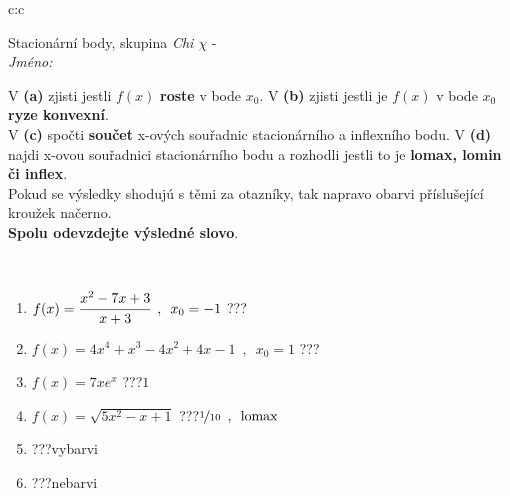 \documentclass[10pt]{report}
\begin{document}
\newpage
\thispagestyle{empty}
\begin{tabular}{c:c}
\begin{minipage}[c][104.5mm][t]{0.5\linewidth}
\begin{center}
\vspace{7mm}
{\huge Stacionární body, skupina \textit{Chi $\chi$} -}\\[5mm]
\textit{Jméno:}\phantom{xxxxxxxxxxxxxxxxxxxxxxxxxxxxxxxxxxxxxxxxxxxxxxxxxxxxxxxxxxxxxxxxx}\\[5mm]
\begin{minipage}{0.95\linewidth}
\begin{center}
{\small V \textbf{(a)} zjisti jestli $f(x)$ \textbf{roste} v bode $x_0$. V \textbf{(b)} zjisti jestli je $f(x)$ v bode $x_0$ \textbf{ryze konvexní}.\\V \textbf{(c)} spočti \textbf{součet} x-ových souřadnic stacionárního a inflexního bodu. V \textbf{(d)} najdi x-ovou souřadnici stacionárního bodu a rozhodli jestli to je \textbf{lomax, lomin či inflex}.\\Pokud se výsledky shodujú s těmi za otazníky, tak napravo obarvi příslušející kroužek načerno.\\\textbf{Spolu odevzdejte výsledné slovo}}.
\end{center}
\end{minipage}
\\[1mm]
\begin{minipage}{0.79\linewidth}
\begin{center}
\begin{varwidth}{\linewidth}
\begin{enumerate}
\normalsize
\item $f(x)=\cfrac{x^2-7x+3}{x+3}\enspace , \enspace x_0=-1$\quad \dotfill\; ???\;\dotfill \quad {}
\item $f(x)=4x^4+x^3-4x^2+4x-1\enspace , \enspace x_0=1$\quad \dotfill\; ???\;\dotfill \quad {}
\item $f(x)=7xe^{x}$\quad \dotfill\; ???\;\dotfill \quad $1$
\item $f(x)=\sqrt{5x^2-x+1}$\quad \dotfill\; ???\;\dotfill \quad $\nicefrac{1}{10}\enspace , \enspace\mathrm{lomax}$
\item \quad \dotfill\; ???\;\dotfill \quad vybarvi
\item \quad \dotfill\; ???\;\dotfill \quad nebarvi
\end{enumerate}
\end{varwidth}
\end{center}

\end{minipage}
\end{center}
\end{minipage}
\end{tabular}
\end{document}
